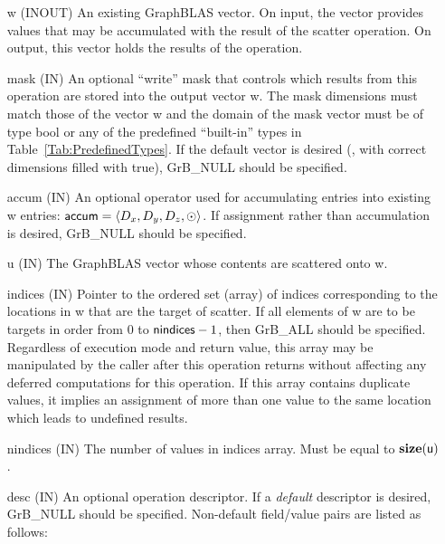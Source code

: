 \begin{itemize}[leftmargin=1in]
    \item[{\sf w}]    ({\sf INOUT}) An existing GraphBLAS vector.  On input,
    the vector provides values that may be accumulated with the result of the
    scatter operation.  On output, this vector holds the results of the
    operation.

    \item[{\sf mask}] ({\sf IN}) An optional ``write'' mask that controls which
    results from this operation are stored into the output vector {\sf w}. The 
    mask dimensions must match those of the vector {\sf w} and the domain of the
    {\sf mask} vector must be of type {\sf bool} or any of the predefined 
    ``built-in'' types in Table~\ref{Tab:PredefinedTypes}.  If the default vector
    is desired (\ie, with correct dimensions filled with {\sf true}), 
    {\sf GrB\_NULL} should be specified.

    \item[{\sf accum}]    ({\sf IN}) An optional operator used for accumulating
    entries into existing {\sf w} entries: ${\sf accum} = \langle D_x,
    D_y, D_z,\odot \rangle$. If assignment rather than accumulation is
    desired, {\sf GrB\_NULL} should be specified.

    \item[{\sf u}]        ({\sf IN}) The GraphBLAS vector whose contents are 
	   scattered onto {\sf w}.
    
    \item[{\sf indices}]  ({\sf IN}) Pointer to the ordered set (array) of 
    indices corresponding to the locations in {\sf w} that are the target of scatter.  
    If all elements of {\sf w} are to be targets in order from $0$ to 
    ${\sf nindices} - 1$, then {\sf GrB\_ALL} should be specified.  Regardless of 
    execution mode and return value, this array may be manipulated by the caller
    after this operation returns without affecting any deferred computations for 
    this operation.  
    If this array contains duplicate values, it implies an assignment of more 
    than one value to the same location which leads to undefined results.
    
    \item[{\sf nindices}] ({\sf IN}) The number of values in {\sf indices} array.
    Must be equal to $\bold{size}({\sf u})$.

    \item[{\sf desc}] ({\sf IN}) An optional operation descriptor. If
    a \emph{default} descriptor is desired, {\sf GrB\_NULL} should be
    specified. Non-default field/value pairs are listed as follows:  \\


\end{itemize}
